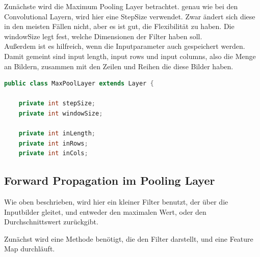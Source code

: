 \documentclass[12pt]{article}
\begin{document}
Zunächste wird die Maximum Pooling Layer betrachtet.
genau wie bei den Convolutional Layern, wird hier eine StepSize verwendet. Zwar ändert sich diese in den meisten Fällen nicht, aber es ist gut, die Flexibilität zu haben.
Die windowSize legt fest, welche Dimensionen der Filter haben soll.
\\Außerdem ist es hilfreich, wenn die Inputparameter auch gespeichert werden. Damit gemeint sind input length, input rows und input columns, also die Menge an Bildern, zusammen mit den Zeilen und Reihen die diese Bilder haben.

\begin{lstlisting}[language=Java]
public class MaxPoolLayer extends Layer {

    private int stepSize;
    private int windowSize;

    private int inLength;
    private int inRows;
    private int inCols;
\end{lstlisting} 

\subsection{Forward Propagation im Pooling Layer}
Wie oben beschrieben, wird hier ein kleiner Filter benutzt, der über die Inputbilder gleitet, und entweder den maximalen Wert, oder den Durchschnittswert zurückgibt. 


Zunächst wird eine Methode benötigt, die den Filter darstellt, und eine Feature Map durchläuft. 
\end{document}

